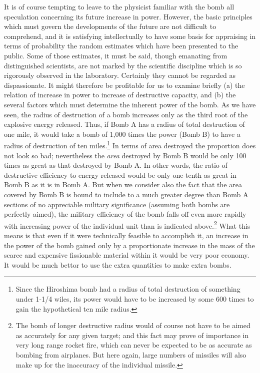 It is of course tempting to leave to the physicist familiar with the bomb all speculation concerning its future increase in power. However, the basic principles which must govern the developments of the future are not difficult to comprehend, and it is satisfying intellectually to have some basis for appraising in terms of probability the random estimates which have been presented to the public. Some of those estimates, it must be said, though emanating from distinguished scientists, are not marked by the scientific discipline which is so rigorously observed in the laboratory. Certainly they cannot be regarded as dispassionate. It might therefore be profitable for us to examine briefly (a) the relation of increase in power to increase of destructive capacity, and (b) the several factors which must determine the inherent power of the bomb. As we have seen, the radius of destruction of a bomb increases only as the third root of the explosive energy released. Thus, if Bomb A has a radius of total destruction of one mile, it would take a bomb of 1,000 times the power (Bomb B) to have a radius of destruction of ten miles.\footnote{Since the Hiroshima bomb had a radius of total destruction of something under 1-1/4 wiles, its power would have to be increased by some 600 times to gain the hypothetical ten mile radius.} In terms of area destroyed the proportion does not look so bad; nevertheless the \emph{area} destroyed by Bomb B would be only 100 times as great as that destroyed by Bomb A. In other words, the ratio of destructive efficiency to energy released would be only one-tenth as great in Bomb B as it is in Bomb A. But when we consider also the fact that the area covered by Bomb B is bound to include to a much greater degree than Bomb A sections of no appreciable military significance (assuming both bombs are perfectly aimed), the military efficiency of the bomb falls off even more rapidly with increasing power of the individual unit than is indicated above.\footnote{The bomb of longer destructive radius would of course not have to be aimed as accurately for any given target; and this fact may prove of importance in very long range rocket fire, which can never be expected to be as accurate as bombing from airplanes. But here again, large numbers of missiles will also make up for the inaccuracy of the individual missile.} What this means is that even if it were technically feasible to accomplish it, an increase in the power of the bomb gained only by a proportionate increase in the mass of the scarce and expensive fissionable material within it would be very poor economy. It would be much bettor to use the extra quantities to make extra bombs.

